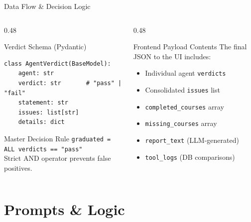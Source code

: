 \documentclass[aspectratio=169]{beamer}
\begin{document}
\begin{frame}[fragile]{Data Flow \& Decision Logic}
  \begin{columns}[T]
    \begin{column}{0.48\textwidth}
      \begin{block}{Verdict Schema (Pydantic)}
        \begin{lstlisting}[style=code]
class AgentVerdict(BaseModel):
    agent: str
    verdict: str       # "pass" | "fail"
    statement: str
    issues: list[str]
    details: dict
        \end{lstlisting}
      \end{block}
      \begin{block}{Master Decision Rule}
        \centering
        \vspace{0.2em}
        \texttt{graduated = ALL verdicts == "pass"}
        \vspace{0.2em}\\
        \footnotesize Strict AND operator prevents false positives.
      \end{block}
    \end{column}
    \begin{column}{0.48\textwidth}
      \begin{block}{Frontend Payload Contents}
        \small The final JSON to the UI includes:
        \begin{itemize}
          \item Individual agent \texttt{verdicts}
          \item Consolidated \texttt{issues} list
          \item \texttt{completed\_courses} array
          \item \texttt{missing\_courses} array
          \item \texttt{report\_text} (LLM-generated)
          \item \texttt{tool\_logs} (DB comparisons)
        \end{itemize}
      \end{block}
    \end{column}
  \end{columns}
\end{frame}

\section{Prompts \& Logic}
\end{document}
